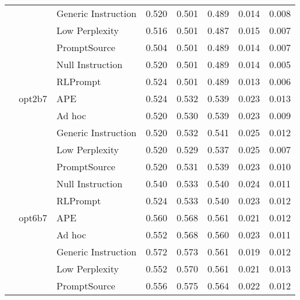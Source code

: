 \begin{supertabular}{lllrrrrr}
              &        & Generic Instruction &            0.520 &           0.501 &          0.489 &        0.014 &    0.008 \\
              &        & Low Perplexity &            0.516 &           0.501 &          0.487 &        0.015 &    0.007 \\
              &        & PromptSource &            0.504 &           0.501 &          0.489 &        0.014 &    0.007 \\
              &        & Null Instruction &            0.520 &           0.501 &          0.489 &        0.014 &    0.005 \\
              &        & RLPrompt &            0.524 &           0.501 &          0.489 &        0.013 &    0.006 \\
              & opt2b7 & APE &            0.524 &           0.532 &          0.539 &        0.023 &    0.013 \\
              &        & Ad hoc &            0.520 &           0.530 &          0.539 &        0.023 &    0.009 \\
              &        & Generic Instruction &            0.520 &           0.532 &          0.541 &        0.025 &    0.012 \\
              &        & Low Perplexity &            0.520 &           0.529 &          0.537 &        0.025 &    0.007 \\
              &        & PromptSource &            0.520 &           0.531 &          0.539 &        0.023 &    0.010 \\
              &        & Null Instruction &            0.540 &           0.533 &          0.540 &        0.024 &    0.011 \\
              &        & RLPrompt &            0.524 &           0.533 &          0.540 &        0.023 &    0.012 \\
              & opt6b7 & APE &            0.560 &           0.568 &          0.561 &        0.021 &    0.012 \\
              &        & Ad hoc &            0.552 &           0.568 &          0.560 &        0.023 &    0.011 \\
              &        & Generic Instruction &            0.572 &           0.573 &          0.561 &        0.019 &    0.012 \\
              &        & Low Perplexity &            0.552 &           0.570 &          0.561 &        0.021 &    0.013 \\
              &        & PromptSource &            0.556 &           0.575 &          0.564 &        0.022 &    0.012 \\

\end{supertabular}
